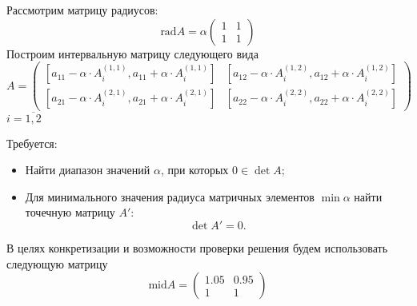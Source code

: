 \documentclass[a4paper,14pt]{article}
\begin{document}
	Рассмотрим матрицу радиусов:
	\begin{equation}
		\text{rad}A = \alpha \begin{pmatrix}
			1 & 1\\ 
			1 & 1
		\end{pmatrix}
	\end{equation}
	Построим интервальную матрицу следующего вида
	\begin{equation}
		A = 
		\begin{pmatrix}
			[a_{11} - \alpha \cdot A^{(1,1)}_i, a_{11} + \alpha \cdot A^{(1,1)}_i ]  & [a_{12} - \alpha \cdot A^{(1,2)}_i, a_{12} + \alpha \cdot A^{(1,2)}_i ]\\ 
			[a_{21} - \alpha \cdot A^{(2,1)}_i, a_{21} + \alpha \cdot A^{(2,1)}_i ] & [a_{22} - \alpha \cdot A^{(2,2)}_i, a_{22} + \alpha \cdot A^{(2,2)}_i ]
		\end{pmatrix}
	\end{equation}
	$i=\overline{1,2}$

	Требуется:
	\begin{itemize}
		\item Найти диапазон значений \( \alpha \), при которых
      \( 0 \in \det A \);
		\item Для минимального значения радиуса матричных элементов
		\( \min \alpha \) найти точечную матрицу \( A' \):
		\[
			\det A' = 0.
		\]
	\end{itemize}
	

	В целях конкретизации и возможности проверки решения будем использовать следующую матрицу
	\begin{equation}
		\text{mid} A = \begin{pmatrix}
			1.05 & 0.95\\ 
			1 & 1
		\end{pmatrix}
	\end{equation}
\end{document}
